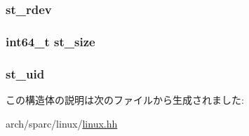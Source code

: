 \label{structSparcLinux_1_1tgt__stat_a57eca117f38b8e28cca30edc65cc6af8}
\hypertarget{structSparcLinux_1_1tgt__stat_ac4a67c3d290b4f93d0d91b99776f4207}{
\subsubsection[{st\_\-rdev}]{ {\bf st\_\-rdev}}}
\label{structSparcLinux_1_1tgt__stat_ac4a67c3d290b4f93d0d91b99776f4207}
\hypertarget{structSparcLinux_1_1tgt__stat_aec608d79c93ed6d010aec9f7487e0064}{
\subsubsection[{st\_\-size}]{\setlength{\rightskip}{0pt plus 5cm}int64\_\-t {\bf st\_\-size}}}
\label{structSparcLinux_1_1tgt__stat_aec608d79c93ed6d010aec9f7487e0064}
\hypertarget{structSparcLinux_1_1tgt__stat_ad5477a292a4edf27aa5766e01e0f5d1f}{
\subsubsection[{st\_\-uid}]{ {\bf st\_\-uid}}}
\label{structSparcLinux_1_1tgt__stat_ad5477a292a4edf27aa5766e01e0f5d1f}


この構造体の説明は次のファイルから生成されました:\begin{DoxyCompactItemize}
\item 
arch/sparc/linux/\hyperlink{arch_2sparc_2linux_2linux_8hh}{linux.hh}\end{DoxyCompactItemize}

